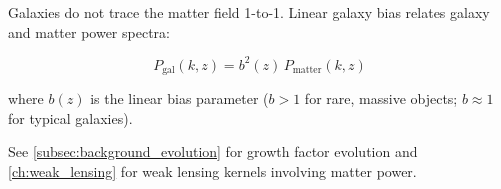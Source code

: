 Galaxies do not trace the matter field 1-to-1. Linear galaxy bias relates galaxy and matter power spectra:

\begin{equation}
P_{\text{gal}}(k, z) = b^2(z) \, P_{\text{matter}}(k, z)
\end{equation}

where $b(z)$ is the linear bias parameter ($b > 1$ for rare, massive objects; $b \approx 1$ for typical galaxies).


See \cref{subsec:background_evolution} for growth factor evolution and \cref{ch:weak_lensing} for weak lensing kernels involving matter power.
